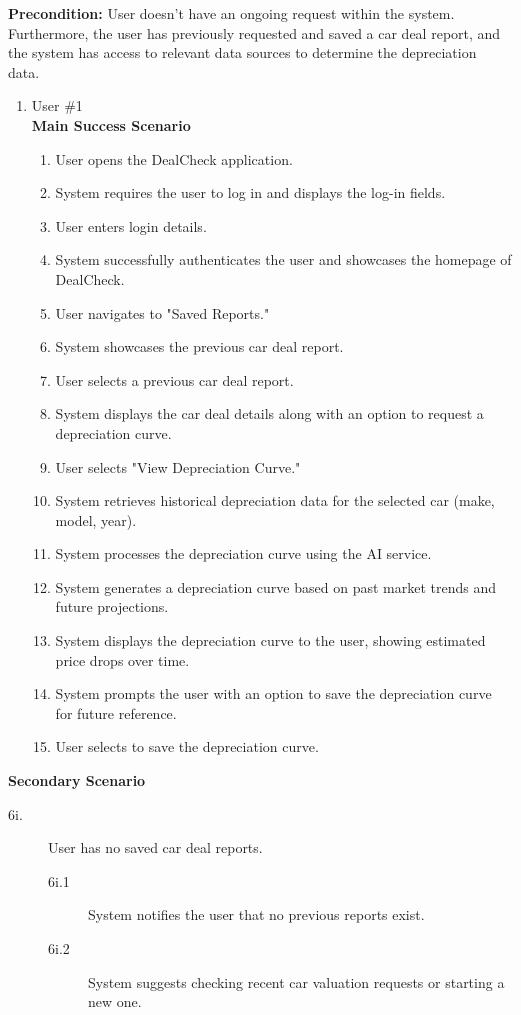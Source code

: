 \documentclass[]{article}
\begin{document}
\begin{enumerate}
\begin{enumerate}[{\bf {BE}1.}]
{\bf Precondition:} User doesn't have an ongoing request within the system. Furthermore, the user has previously requested and saved a car deal report, and the system 
	has access to relevant data sources to determine the depreciation data.
	\begin{enumerate}[{\bf VP1.}]
		\item User \#1 \\
		{\bf Main Success Scenario}
		\begin{enumerate}[1.]
			\item User opens the DealCheck application.
			\item System requires the user to log in and displays the log-in fields.
			\item User enters login details.
			\item System successfully authenticates the user and showcases the homepage of DealCheck.
			\item User navigates to "Saved Reports."
			\item System showcases the previous car deal report.
			\item User selects a previous car deal report.
			\item System displays the car deal details along with an option to request a depreciation curve.
			\item User selects "View Depreciation Curve."
			\item System retrieves historical depreciation data for the selected car (make, model, year).
			\item System processes the depreciation curve using the AI service.
			\item System generates a depreciation curve based on past market trends and future projections.
			\item System displays the depreciation curve to the user, showing estimated price drops over time.
			\item System prompts the user with an option to save the depreciation curve for future reference.
			\item User selects to save the depreciation curve.
		\end{enumerate}
	\end{enumerate}
		{\bf Secondary Scenario}
		\begin{description}
			\item[6i.] User has no saved car deal reports.
			\begin{description}
				\item[6i.1] System notifies the user that no previous reports exist.
				\item[6i.2] System suggests checking recent car valuation requests or starting a new one.
			\end{description}
			

\end{description}
\end{enumerate}
\end{enumerate}
\end{document}
